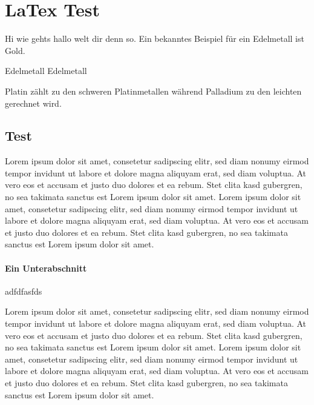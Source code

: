 \chapter{LaTex Test}
Hi wie gehts hallo welt dir denn so.
Ein bekanntes Beispiel für ein Edelmetall ist Gold.

Edelmetall
Edelmetall

Platin zählt zu den schweren
Platinmetallen während Palladium
zu den leichten gerechnet wird.

\section{Test}
Lorem ipsum dolor sit amet, consetetur sadipscing elitr, sed diam nonumy eirmod tempor invidunt ut labore et dolore magna aliquyam erat, sed diam voluptua. At vero eos et accusam et justo duo dolores et ea rebum. Stet clita kasd gubergren, no sea takimata sanctus est Lorem ipsum dolor sit amet. Lorem ipsum dolor sit amet, consetetur sadipscing elitr, sed diam nonumy eirmod tempor invidunt ut labore et dolore magna aliquyam erat, sed diam voluptua. At vero eos et accusam et justo duo dolores et ea rebum. Stet clita kasd gubergren, no sea takimata sanctus est Lorem ipsum dolor sit amet.

\subsubsection{Ein Unterabschnitt}

\cite[haa]{Sadiku.2014}{adfdfasfds}

Lorem ipsum dolor sit amet, consetetur sadipscing elitr, sed diam nonumy eirmod tempor invidunt ut labore et dolore magna aliquyam erat, sed diam voluptua. At vero eos et accusam et justo duo dolores et ea rebum. Stet clita kasd gubergren, no sea takimata sanctus est Lorem ipsum dolor sit amet. Lorem ipsum dolor sit amet, consetetur sadipscing elitr, sed diam nonumy eirmod tempor invidunt ut         labore et dolore magna aliquyam erat, sed diam voluptua. At vero eos et accusam et justo duo dolores et ea rebum. Stet clita kasd gubergren, no sea takimata sanctus est Lorem ipsum dolor sit amet.